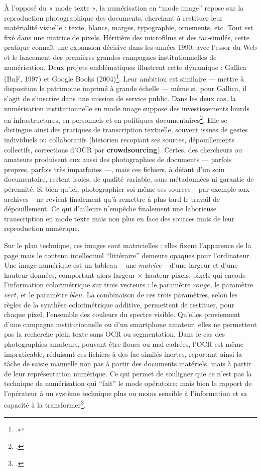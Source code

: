 À l’opposé du « mode texte », la numérisation en \enquote{mode image} repose sur la reproduction photographique des documents, cherchant à restituer leur matérialité visuelle : texte, blancs, marges, typographie, ornements, etc. Tout est fixé dans une matrice de pixels. Héritière des microfilms et des fac-similés, cette pratique connaît une expansion décisive dans les années 1990, avec l’essor du Web et le lancement des premières grandes campagnes institutionnelles de numérisation. Deux projets emblématiques illustrent cette dynamique : Gallica (BnF, 1997) et Google Books (2004)\footcite[][]{bermesbook}. Leur ambition est similaire — mettre à disposition le patrimoine imprimé à grande échelle — même si, pour Gallica, il s'agit de s’inscrire dans une mission de service public. Dans les deux cas, la numérisation institutionnelle en mode image suppose des investissements lourds en infrastructures, en personnels et en politiques documentaires\footcite[][p. 66-88]{claerr}. Elle se distingue ainsi des pratiques de transcription textuelle, souvent issues de gestes individuels ou collaboratifs (historien recopiant ses sources, dépouillements collectifs, corrections d’OCR par \textbf{crowdsourcing}). Certes, des chercheurs ou amateurs produisent eux aussi des photographies de documents — parfois propres, parfois très imparfaites —, mais ces fichiers, à défaut d'un soin documentaire, restent isolés, de qualité variable, sans métadonnées ni garantie de pérennité. Si bien qu'ici, photographier soi-même ses sources -- par exemple aux archives -- ne revient finalement qu'à remettre à plus tard le travail de dépouillement. Ce qui d'ailleurs n'empêche finalement une laborieuse transcription en mode texte mais non plus en face des sources mais de leur reproduction numérique. 

Sur le plan technique, ces images sont matricielles : elles fixent l’apparence de la page mais le contenu intellectuel \enquote{littéraire} demeure opaques pour l’ordinateur. Une image numérique est un tableau -- une \emph{matrice} -- d'une largeur et d'une hauteur données, comportant alors largeur $\times$ hauteur pixels, pixels qui encode l'information colorimétrique sur trois vecteurs : le paramètre $rouge$, le paramètre $vert$, et le paramètre $bleu$. La combinaison de ces trois paramètres, selon les règles de la synthèse colorimétrique additive, permettent de restituer, pour chaque pixel, l'ensemble des couleurs du spectre visible. Qu’elles proviennent d’une campagne institutionnelle ou d’un smartphone amateur, elles ne permettent pas la recherche plein texte sans OCR ou segmentation. Dans le cas des photographies amateurs, pouvant être floues ou mal cadrées, l’OCR est même impraticable, réduisant ces fichiers à des fac-similés inertes, reportant ainsi la tâche de saisie manuelle non pas à partir des documents matériels, mais à partir de leur représentation numérique. Ce qui permet de souligner que ce n'est pas la technique de numérisation qui \enquote{fait} le mode opératoire; mais bien le rapport de l'opérateur à un système technique plus ou moins sensible à l'information et sa capacité à la transformer\footcite[][]{meot}.


